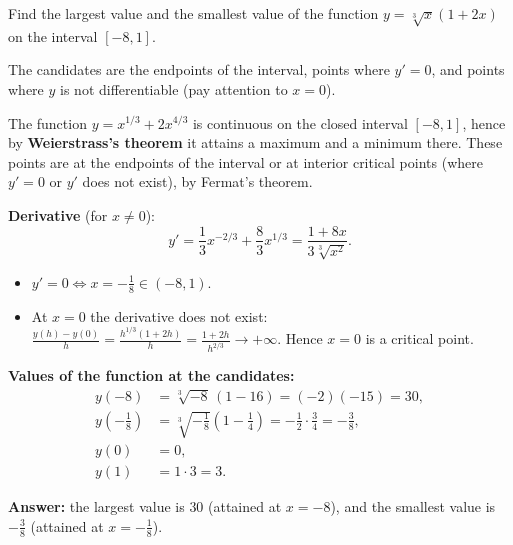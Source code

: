 
\begin{question}
Find the largest value and the smallest value of the function $y=\sqrt[3]{x}(1+2x)$ on the interval $[-8,1]$.
\end{question}

\begin{hint}
The candidates are the endpoints of the interval, points where $y'=0$, and points where $y$ is not differentiable (pay attention to $x=0$).
\end{hint}

\begin{solution}
The function $y=x^{1/3}+2x^{4/3}$ is continuous on the closed interval $[-8,1]$, hence by \textbf{Weierstrass's theorem} it attains a maximum and a minimum there. These points are at the endpoints of the interval or at interior critical points (where $y'=0$ or $y'$ does not exist), by Fermat's theorem.

\textbf{Derivative} (for $x\ne0$):
\[ y' = \frac13x^{-2/3}+\frac83x^{1/3} = \frac{1+8x}{3\sqrt[3]{x^2}}. \]
\begin{itemize}
  \item $y'=0\iff x=-\frac18\in(-8,1)$.
  \item At $x=0$ the derivative does not exist: $\frac{y(h)-y(0)}{h}=\frac{h^{1/3}(1+2h)}{h}=\frac{1+2h}{h^{2/3}}\to+\infty$. Hence $x=0$ is a critical point.
\end{itemize}

\textbf{Values of the function at the candidates:}
\begin{align*}
y(-8) &= \sqrt[3]{-8}\,(1-16) = (-2)(-15) = 30,\\
y\left(-\tfrac18\right) &= \sqrt[3]{-\tfrac18}\left(1-\tfrac14\right) = -\tfrac12\cdot\tfrac34 = -\tfrac38,\\
y(0) &= 0,\\
y(1) &= 1\cdot 3 = 3.
\end{align*}

\textbf{Answer:} the largest value is $30$ (attained at $x=-8$), and the smallest value is $-\frac38$ (attained at $x=-\frac18$).
\end{solution}
